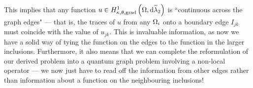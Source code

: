 \documentclass[11pt]{report}
\newcommand{\tlambda}{\widetilde{\lambda}}
\begin{document}
This implies that any function $u\in\ktgradSob{\ddom}{\tlambda_2}$ is ``continuous across the graph edges" --- that is, the traces of $u$ from any $\Omega_i$ onto a boundary edge $I_{jk}$ must coincide with the value of $u_{jk}$.
This is invaluable information, as now we have a solid way of tying the function on the edges to the function in the larger inclusions.
Furthermore, it also means that we can complete the reformulation of our derived problem into a quantum graph problem involving a non-local operator --- we now just have to read off the information from other edges rather than information about a function on the neighbouring inclusions!
\end{document}
